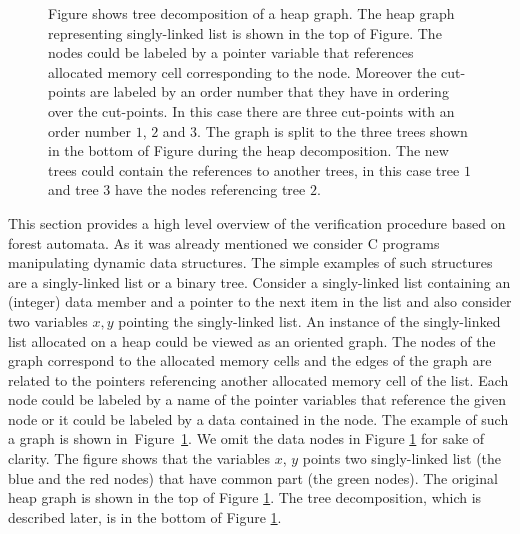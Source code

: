 \documentclass[fleqn,11pt]{ExcelAtFIT} %
\begin{document}
\begin{figure}[t]
	\centering
	
	
	\vspace{0.5cm}
	
	
	\caption{
	Figure shows tree decomposition of a heap graph.
    The heap graph representing singly-linked list is shown in the top of Figure.
	The nodes could be labeled by a pointer variable that references allocated memory cell
	corresponding to the node.
	Moreover the cut-points are labeled by an order number that they have in ordering over
	the cut-points.
	In this case there are three cut-points with an order number $1$, $2$ and $3$.
	The graph is split to the three trees shown in the bottom of Figure during the heap decomposition.
	The new trees could contain the references to another trees, in this case tree $1$ and tree $3$
	have the nodes referencing tree $2$.}
	\label{fig:graph}
\end{figure}

This section provides a high level overview of the verification procedure based
on forest automata.
As it was already mentioned we consider C programs manipulating dynamic data structures.
The simple examples of such structures are a singly-linked list or a binary tree.
Consider a singly-linked list containing an (integer) data member and a pointer
to the next item in the list and also
consider two variables $x,y$ pointing the singly-linked list.
An instance of the singly-linked list allocated on a heap could be viewed as an oriented graph.
The nodes of the graph correspond to the allocated memory cells
and the edges of the graph are related to the pointers referencing
another allocated memory cell of the list.
Each node could be labeled by a name of the pointer variables that
reference the given node or it could be labeled by a data contained in the node.
The example of such a graph is shown in~Figure~\ref{fig:graph}.
We omit the data nodes in Figure \ref{fig:graph} for sake of clarity.
The figure shows that the variables $x$, $y$ points two singly-linked list (the blue and the red nodes) that
have common part (the green nodes).
The original heap graph is shown in the top of Figure \ref{fig:graph}.
The tree decomposition, which is described later, is in the bottom of Figure \ref{fig:graph}.
\end{document}
